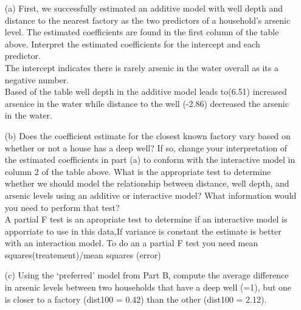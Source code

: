 \documentclass[12pt,letterpaper]{article}
\begin{document}
	
	\vspace{.5cm}
	\begin{enumerate}
		\item [(a)] First, we successfully estimated an additive model with well depth and distance to
		the nearest factory as the two predictors of a household’s arsenic level. The estimated
		coefficients are found in the first column of the table above. Interpret the estimated
		coefficients for the intercept and each predictor.\\
		
		The intercept indicates there is rarely arsenic in the water overall as its a negative number.\\
		Based of the table well depth in the additive model leads to(6.51) increased arsenice in the water while distance to the well (-2.86) decreased the arsenic in the water. 
		
		

		
		\item [(b)]  Does the coefficient estimate for the closest known factory vary based on whether or not
		a house has a deep well? If so, change your interpretation of the estimated coefficients
		in part (a) to conform with the interactive model in column 2 of the table above. What
		is the appropriate test to determine whether we should model the relationship between
		distance, well depth, and arsenic levels using an additive or interactive model? What
		information would you need to perform that test?\\
		
		A partial F test is an apropriate test to determine if an interactive model is apporriate to use in this data,If variance is constant the estimate is better with an interaction model. To do an a partial F test you need mean squares(treatement)/mean squares (error)
		
		
		
		\vspace{2cm}
		\item [(c)] Using the ‘preferred’ model from Part B, compute the average difference in arsenic
		levels between two households that have a deep well (=1), but one is closer to a factory
		(dist100 = 0.42) than the other (dist100 = 2.12).
		\vspace{7cm}
		  
		
		
	\end{enumerate}  
	\newpage

	
\end{document}
